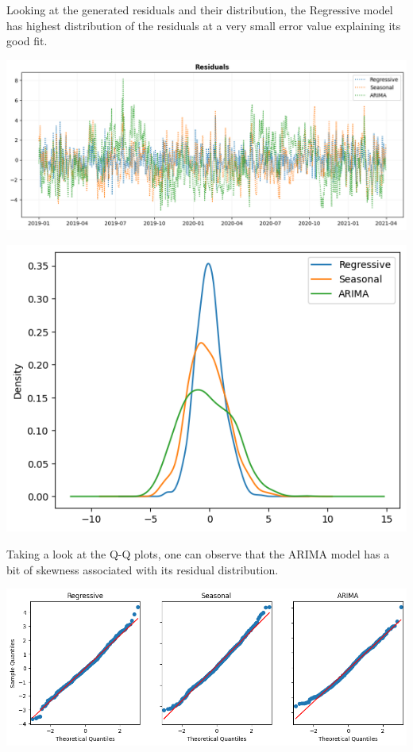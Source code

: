 \documentclass[a4paper,12pt]{article}
\begin{document}
Looking at the generated residuals and their distribution, the Regressive model has highest distribution of the residuals at a very small error value explaining its good fit.

\begin{center}
\includegraphics[width=1.00\textwidth]{./images/tiru/dailyResid.png}
\end{center}

\begin{center}
\includegraphics[width=0.8\linewidth]{./images/tiru/dailyDist.png}
\end{center}

Taking a look at the Q-Q plots, one can observe that the ARIMA model has a bit of skewness associated with its residual distribution.

\begin{center}
\includegraphics[width=0.8\linewidth]{./images/tiru/dailyQQ.png}
\end{center}
\end{document}
